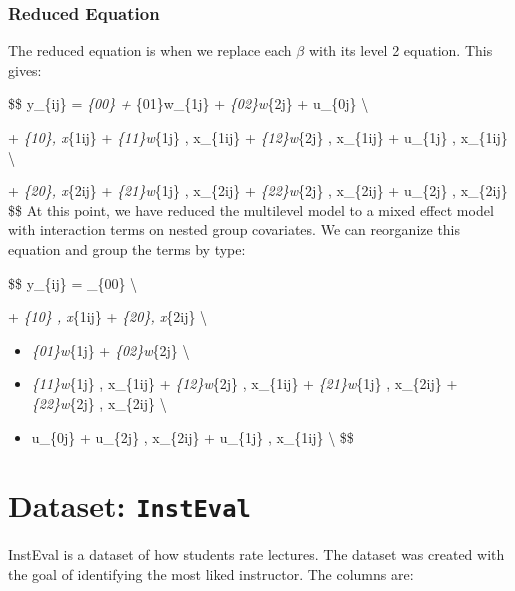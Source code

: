 \documentclass[
]{article}
\begin{document}
\hypertarget{reduced-equation}{%
\subsubsection{Reduced Equation}\label{reduced-equation}}

The reduced equation is when we replace each \(\beta\) with its level 2
equation. This gives:

\$\$ y\_\{ij\} = \gamma\emph{\{00\} + \gamma}\{01\}w\_\{1j\} +
\gamma\emph{\{02\}w}\{2j\} + u\_\{0j\} \textbackslash{}

\qquad + \gamma\emph{\{10\}, x}\{1ij\} + \gamma\emph{\{11\}w}\{1j\} ,
x\_\{1ij\} + \gamma\emph{\{12\}w}\{2j\} , x\_\{1ij\} + u\_\{1j\} ,
x\_\{1ij\} \textbackslash{}

\qquad + \gamma\emph{\{20\}, x}\{2ij\} + \gamma\emph{\{21\}w}\{1j\} ,
x\_\{2ij\} + \gamma\emph{\{22\}w}\{2j\} , x\_\{2ij\} + u\_\{2j\} ,
x\_\{2ij\} \$\$ At this point, we have reduced the multilevel model to a
mixed effect model with interaction terms on nested group covariates. We
can reorganize this equation and group the terms by type:

\$\$ y\_\{ij\} = \gamma\_\{00\}
\textbackslash{}

\qquad + \gamma\emph{\{10\} , x}\{1ij\} + \gamma\emph{\{20\}, x}\{2ij\}
 \textbackslash{}

\begin{itemize}
\item
  \gamma\emph{\{01\}w}\{1j\} + \gamma\emph{\{02\}w}\{2j\}
  \textbackslash{}
\item
  \gamma\emph{\{11\}w}\{1j\} , x\_\{1ij\} + \gamma\emph{\{12\}w}\{2j\} ,
  x\_\{1ij\} + \gamma\emph{\{21\}w}\{1j\} , x\_\{2ij\} +
  \gamma\emph{\{22\}w}\{2j\} , x\_\{2ij\}
  \textbackslash{}
\item
  u\_\{0j\} + u\_\{2j\} , x\_\{2ij\} + u\_\{1j\} , x\_\{1ij\}
  \textbackslash{} \$\$
\end{itemize}

\hypertarget{dataset-insteval}{%
\section{\texorpdfstring{Dataset:
\texttt{InstEval}}{Dataset: InstEval}}\label{dataset-insteval}}

InstEval is a dataset of how students rate lectures. The dataset was
created with the goal of identifying the most liked instructor. The
columns are:
\end{document}
